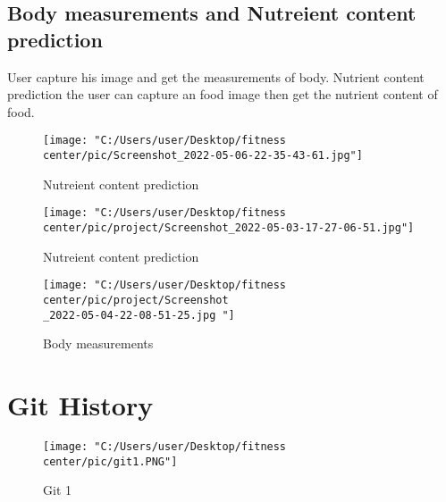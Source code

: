 \documentclass[a4paper,12pt,toc=flat]{report}
\begin{document}
{{ \subsection {Body measurements and Nutreient content prediction}
 User capture his image and get the measurements of body. Nutrient content prediction the user can capture an food image then get the nutrient content of food.
\begin{figure}[!ht]
	\begin{minipage}{0.45\linewidth}
		\texttt{[image: "C:/Users/user/Desktop/fitness center/pic/Screenshot\_2022-05-06-22-35-43-61.jpg"]}
		\caption{Nutreient content prediction}
	\end{minipage}
	\hfill
	\begin{minipage}{0.4\linewidth}
		\texttt{[image: "C:/Users/user/Desktop/fitness center/pic/project/Screenshot\_2022-05-03-17-27-06-51.jpg"]}
		\caption{Nutreient content prediction }
	\end{minipage}
\end{figure}
\begin{figure}[!ht]
	\begin{minipage}{0.45\linewidth}
		\texttt{[image: "C:/Users/user/Desktop/fitness center/pic/project/Screenshot\\\_2022-05-04-22-08-51-25.jpg	"]}
		\caption{Body measurements}
	\end{minipage}
	
	
	
\end{figure}
 \newpage
 
 
 
 

 
 
 
 
 \section{Git History}
 
 \begin{figure}[bph]
 	\centering
 	\texttt{[image: "C:/Users/user/Desktop/fitness center/pic/git1.PNG"]} 
 	\caption{Git 1} 
 	\label{u1}
 \end{figure}
 
}}
\end{document}
